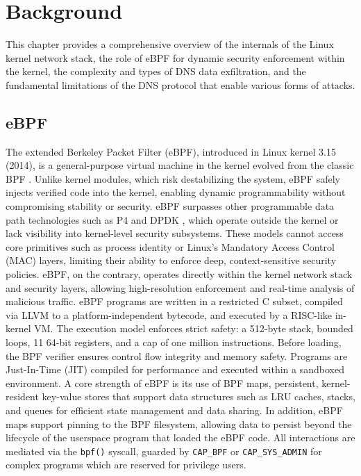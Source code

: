 \documentclass [11pt, proquest] {uwthesis}[2020/02/24]
\begin{document}
\chapter {Background}
This chapter provides a comprehensive overview of the internals of the Linux kernel network stack, the role of eBPF for dynamic security enforcement within the kernel, the complexity and types of DNS data exfiltration, and the fundamental limitations of the DNS protocol that enable various forms of attacks.

\section{eBPF}
The extended Berkeley Packet Filter (eBPF), introduced in Linux kernel 3.15 (2014), is a general-purpose virtual machine in the kernel evolved from the classic BPF \cite{10.5555/1267303.1267305}. Unlike kernel modules, which risk destabilizing the system, eBPF safely injects verified code into the kernel, enabling dynamic programmability without compromising stability or security. eBPF surpasses other programmable data path technologies such as P4 \cite{bosshart2014p4} and DPDK \cite{8701793}, which operate outside the kernel or lack visibility into kernel-level security subsystems. These models cannot access core primitives such as process identity or Linux’s Mandatory Access Control (MAC) layers, limiting their ability to enforce deep, context-sensitive security policies. eBPF, on the contrary, operates directly within the kernel network stack and security layers, allowing high-resolution enforcement and real-time analysis of malicious traffic. eBPF programs are written in a restricted C subset, compiled via LLVM to a platform-independent bytecode, and executed by a RISC-like in-kernel VM. The execution model enforces strict safety: a 512-byte stack, bounded loops, 11 64-bit registers, and a cap of one million instructions. Before loading, the BPF verifier ensures control flow integrity and memory safety. Programs are Just-In-Time (JIT) compiled for performance and executed within a sandboxed environment. A core strength of eBPF is its use of BPF maps, persistent, kernel-resident key-value stores that support data structures such as LRU caches, stacks, and queues for efficient state management and data sharing. In addition, eBPF maps support pinning to the BPF filesystem, allowing data to persist beyond the lifecycle of the userspace program that loaded the eBPF code. All interactions are mediated via the \texttt{bpf()} syscall, guarded by \texttt{CAP\_BPF} or \texttt{CAP\_SYS\_ADMIN} for complex programs which are reserved for privilege users.
\end{document}
